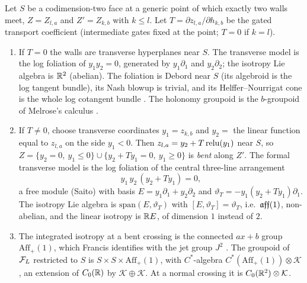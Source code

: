 \begin{theorem}\label{thm:bent}
Let $S$ be a codimension-two face at a generic point of which exactly two walls meet, $Z=Z_{l,a}$ and $Z'=Z_{k,b}$ with $k\le l$. Let
$T=\partial z_{l,a}/\partial h_{k,b}$ be the gated transport coefficient (intermediate gates fixed at the point; $T=0$ if $k=l$).
\begin{enumerate}[leftmargin=*]
\item If $T=0$ the walls are transverse hyperplanes near $S$. The transverse model is the log foliation of $y_1y_2=0$, generated by $y_1\partial_1$
and $y_2\partial_2$; the isotropy Lie algebra is $\mathbb R^2$ (abelian). The foliation is Debord near $S$ (its algebroid is the log tangent
bundle), its Nash blowup is trivial, and its Helffer--Nourrigat cone is the whole log cotangent bundle \cite{Louis}. The holonomy groupoid
is the $b$-groupoid of Melrose's calculus \cite{Melrose}.
\item If $T\ne0$, choose transverse coordinates $y_1=z_{k,b}$ and $y_2=$ the linear function equal to $z_{l,a}$ on the side $y_1<0$. Then
$z_{l,a}=y_2+T\operatorname{relu}(y_1)$ near $S$, so $Z=\{y_2=0,\ y_1\le0\}\cup\{y_2+Ty_1=0,\ y_1\ge0\}$ is \emph{bent} along $Z'$. The formal transverse model is
the log foliation of the central three-line arrangement
\[
y_1\,y_2\,(y_2+Ty_1)=0 ,
\]
a free module (Saito) with basis $E=y_1\partial_1+y_2\partial_2$ and $\vartheta_T=-y_1(y_2+Ty_1)\partial_1$. The isotropy Lie algebra is
$\mathrm{span}(E,\vartheta_T)$ with $[E,\vartheta_T]=\vartheta_T$, i.e.\ $\mathfrak{aff}(1)$, non-abelian, and the linear isotropy is $\mathbb R E$, of dimension $1$
instead of $2$.
\item The integrated isotropy at a bent crossing is the connected $ax+b$ group $\mathrm{Aff}_+(1)$, which Francis identifies with the jet
group $J^2$ \cite{Francis}. The groupoid of $\mathcal F_L$ restricted to $S$ is $S\times S\times\mathrm{Aff}_+(1)$, with $C^*$-algebra $C^*(\mathrm{Aff}_+(1))\otimes\mathcal K$, an
extension of $C_0(\mathbb R)$ by $\mathcal K\oplus\mathcal K$. At a normal crossing it is $C_0(\mathbb R^2)\otimes\mathcal K$.
\end{enumerate}
\end{theorem}
